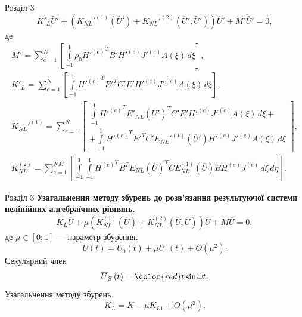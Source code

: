 \documentclass[8pt]{beamer}
\numberwithin{figure}{section}
\numberwithin{equation}{section}
\numberwithin{table}{section}
\begin{document}
\begin{frame}{Розділ 3}
\begin{equation}
K'_L\overline{U}'+\left( K_{NL}'^{(1)}\left( \overline{U}'\right)+K_{NL}'^{(2)}\left( \overline{U}',\overline{U}'\right) \right)\overline{U}'+M'\ddot{\overline{U}}'=0,
\end{equation}
де 
\begin{gather}
M'=\sum_{e=1}^{N}
\left[ \int\limits_{-1}^{1} \rho_0 {H'^{(e)}}^T B' H'^{(e)} J'^{(e)} A\left(\xi\right) \, d\xi \right],\\
K'_L=\sum_{e=1}^{N}
\left[ \int\limits_{-1}^{1}{H'^{(e)}}^T E'^T C' E' H'^{(e)} J'^{(e)} A\left(\xi\right) \, d\xi \right],\\
K_{NL}'^{(1)}=\sum_{e=1}^{N}
\left[ 
\begin{aligned}
\int\limits_{-1}^{1} {H'^{(e)}}^T E'_{NL}\left( \overline{U}'\right)^T C' E' H'^{(e)} J'^{(e)} A\left(\xi\right) \, d\xi  + \\ 
+ \int\limits_{-1}^{1} {H'^{(e)}}^T E'^T C' E_{NL}'^{(1)}\left( \overline{U}'\right) H'^{(e)} J'^{(e)} A\left(\xi\right) \, d\xi 
\end{aligned} 
\right],\\
K_{NL}^{(2)}=\sum_{e=1}^{NM}
\left[ 
\int\limits_{-1}^{1} \int\limits_{-1}^{1} {H^{(e)}}^T B^T E_{NL}\left( \overline{U}\right)^T C E_{NL}^{(1)}\left( \overline{U}\right) B H^{(e)} J^{(e)} \, d\xi \, d\eta 
\right].
\end{gather}

\end{frame}

\begin{frame}{Розділ 3}
\textbf{Узагальнення методу збурень до розв’язання результуючої системи нелінійних алгебраїчних рівнянь.}
\begin{equation}\label{eq:nonlineq}
K_L\overline{U}+\mu \left( K_{NL}^{(1)}\left( \overline{U}\right)+K_{NL}^{(2)}\left( \overline{U},\overline{U}\right) \right)\overline{U}+M\ddot{\overline{U}}=0,
\end{equation}
де $\mu \in [0;1]$ --- параметр збурення.
\begin{equation}
\overline{U}\left(t\right) =\overline{U}_0\left(t\right) + \mu \overline{U}_1\left(t\right) + O\left( \mu^2\right).
\end{equation}
Секулярний член
\begin{equation}
\overline{U}_S\left(t\right) =\begingroup\color{red}t\endgroup \sin \omega t.
\end{equation}
Узагальнення методу збурень
\begin{equation}
K_L = K - \mu K_{L1} + O\left( \mu^2\right).
\end{equation}

\end{frame}
\end{document}

